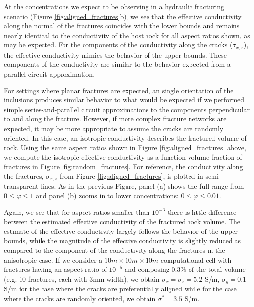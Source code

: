 At the concentrations we expect to be observing in a hydraulic fracturing scenario (Figure \ref{fig:aligned_fractures}b), we see that the effective conductivity along the normal of the fractures coincides with the lower bounds and remains nearly identical to the conductivity of the host rock for all aspect ratios shown, as may be expected. For the components of the conductivity along the cracks ($\sigma_{x, z}$), the effective conductivity mimics the behavior of the upper bounds. These components of the conductivity are similar to the behavior expected from a parallel-circuit approximation.

For settings where planar fractures are expected, an single orientation of the inclusions produces similar behavior to what would be expected if we performed simple series-and-parallel circuit approximations to the components perpendicular to and along the fracture. However, if more complex fracture networks are expected, it may be more appropriate to assume the cracks are randomly oriented. In this case, an isotropic conductivity describes the fractured volume of rock. Using the same aspect ratios shown in Figure \ref{fig:aligned_fractures} above, we compute the isotropic effective conductivity as a function volume fraction of fractures in Figure \ref{fig:random_fractures}. For reference, the conductivity along the fractures, $\sigma_{x, z}$ from Figure \ref{fig:aligned_fractures}, is plotted in semi-transparent lines. As in the previous Figure, panel (a) shows the full range from $0 \leq \varphi \leq 1$ and panel (b) zooms in to lower concentrations: $0 \leq \varphi \leq 0.01$.



Again, we see that for aspect ratios smaller than $10^{-3}$ there is little difference between the estimated effective conductivity of the fractured rock volume. The estimate of the effective conductivity largely follows the behavior of the upper bounds, while the magnitude of the effective conductivity is slightly reduced as compared to the component of the conductivity along the fractures in the anisotropic case. If we consider a $10m \times 10m \times 10m$ computational cell with fractures having an aspect ratio of $10^{-5}$ and composing 0.3\% of the total volume (e.g. 10 fractures, each with 3mm width), we obtain $\sigma_x = \sigma_z = 5.2$ S/m, $\sigma_y = 0.1$ S/m for the case where the cracks are preferentially aligned while for the case where the cracks are randomly oriented, we obtain $\sigma^* = 3.5$ S/m.

